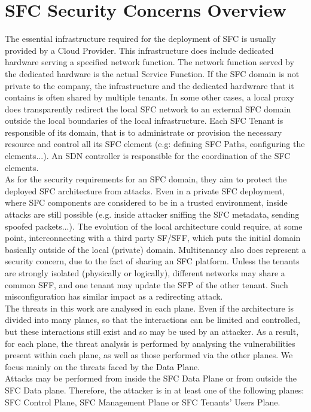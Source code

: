 \section{SFC Security Concerns Overview \cite{nano4}} 
The essential infrastructure required for the deployment of SFC is usually provided by a Cloud Provider. This infrastructure does include dedicated hardware serving a specified network function. The network function served by the dedicated hardware is the actual Service Function. If the SFC domain is not private to the company, the infrastructure and the dedicated hardwrare that it contains is often shared by multiple tenants. In some other cases, a local proxy does transparently redirect the local SFC network to an external SFC domain outside the local boundaries of the local infrastructure. Each SFC Tenant is responsible of its domain, that is to administrate or provision the necessary resource and control all its SFC element (e.g: defining SFC Paths, configuring the elements...). An SDN controller is responsible for the coordination of the SFC elements.\\
As for the security requirements for an SFC domain, they aim to protect the deployed SFC architecture from attacks. Even in a private SFC deployment, where SFC components are considered to be in a trusted environment, inside attacks are still possible (e.g. inside attacker sniffing the SFC metadata, sending spoofed packets...). The evolution of the local architecture could require, at some point, interconnecting with a third party SF/SFF, which puts the initial domain basically outside of the local (private) domain. Multitenancy also does represent a security concern, due to the fact of sharing an SFC platform. Unless the tenants are strongly isolated (physically or logically), different networks may share a common SFF, and one tenant may update the SFP of the other tenant. Such misconfiguration has similar impact as a redirecting attack.\\
The threats in this work are analysed in each plane. Even if the architecture is divided into many planes, so that the interactions can be limited and controlled, but these interactions still exist and so may be used by an attacker. As a result, for each plane, the threat analysis is performed by analysing the vulnerabilities present within each plane, as well as those performed via the other planes. We focus mainly on the threats faced by the Data Plane.\\
Attacks may be performed from inside the SFC Data Plane or from outside the SFC Data plane. Therefore, the attacker is in at least one of the following planes: SFC Control Plane, SFC Management Plane or SFC Tenants’ Users Plane.\\
